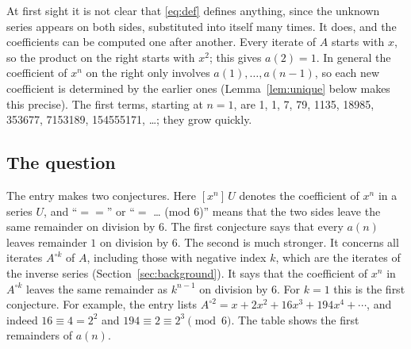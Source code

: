 \documentclass[11pt,a4paper]{article}
\theoremstyle{definition}
\theoremstyle{remark}
\begin{document}
At first sight it is not clear that \eqref{eq:def} defines anything, since the unknown series appears on both sides,
substituted into itself many times. It does, and the coefficients can be computed one after another. Every iterate
of $A$ starts with $x$, so the product on the right starts with $x^2$; this gives $a(2)=1$. In general the
coefficient of $x^n$ on the right only involves $a(1),\dots,a(n-1)$, so each new coefficient is determined by the
earlier ones (Lemma~\ref{lem:unique} below makes this precise). The first terms, starting at $n=1$, are
1, 1, 7, 79, 1135, 18985, 353677, 7153189, 154555171, \dots; they grow quickly.

\subsection{The question}
The entry makes two conjectures. Here $[x^n]\,U$ denotes the coefficient of $x^n$ in a series $U$, and
``$==$'' or ``$=$ \dots{} (mod 6)'' means that the two sides leave the same remainder on division by $6$. The first
conjecture says that every $a(n)$ leaves remainder $1$ on division by $6$. The second is much stronger. It concerns
all iterates $A^{\circ k}$ of $A$, including those with negative index $k$, which are the iterates of the inverse
series (Section~\ref{sec:background}). It says that the coefficient of $x^n$ in $A^{\circ k}$ leaves the same
remainder as $k^{n-1}$ on division by $6$. For $k=1$ this is the first conjecture. For example, the entry lists
$A^{\circ2}=x+2x^2+16x^3+194x^4+\cdots$, and indeed $16\equiv4=2^2$ and $194\equiv2\equiv2^3\pmod6$. The table shows
the first remainders of $a(n)$.
\end{document}
